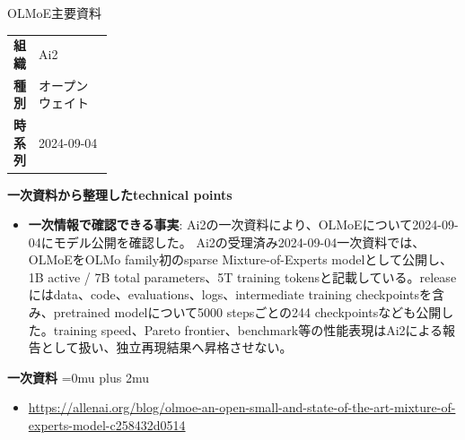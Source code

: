 \begin{technicalnote}{OLMoE}{主要資料}
\begingroup
\begin{tabularx}{\linewidth}{@{}>{\bfseries}p{0.22\linewidth}X@{}}
組織 & Ai2 \\
種別 & オープンウェイト \\
時系列 & 2024-09-04 \\
\end{tabularx}
\smallskip
{\bfseries 一次資料から整理したtechnical points}
\begin{itemize}[leftmargin=1.5em,itemsep=0.35em]
\item \textbf{一次情報で確認できる事実}: Ai2の一次資料により、OLMoEについて2024-09-04にモデル公開を確認した。 Ai2の受理済み2024-09-04一次資料では、OLMoEをOLMo family初のsparse Mixture-of-Experts modelとして公開し、1B active / 7B total parameters、5T training tokensと記載している。releaseにはdata、code、evaluations、logs、intermediate training checkpointsを含み、pretrained modelについて5000 stepsごとの244 checkpointsなども公開した。training speed、Pareto frontier、benchmark等の性能表現はAi2による報告として扱い、独立再現結果へ昇格させない。
\end{itemize}
\begin{minipage}{\linewidth}
\begin{samepage}
{\bfseries 一次資料}
\begingroup\sloppy
\Urlmuskip=0mu plus 2mu\relax
\begin{itemize}[leftmargin=1.5em,itemsep=0.25em]
\item {\scriptsize\url{https://allenai.org/blog/olmoe-an-open-small-and-state-of-the-art-mixture-of-experts-model-c258432d0514}}
\end{itemize}
\endgroup
\end{samepage}
\end{minipage}
\endgroup
\end{technicalnote}
\medskip

